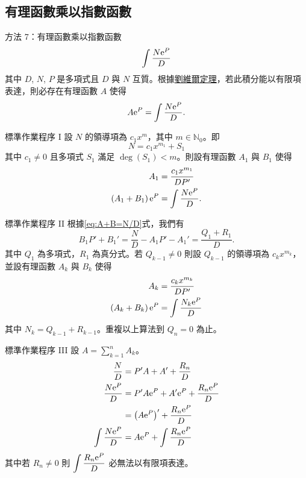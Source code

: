 \documentclass{beamer}
\newcommand{\e}{\textup e}
\newcommand{\N}{\mathbb N}
\theoremstyle{remark}
\begin{document}
\begin{CJK}{UTF8}{bsmi}
\subsection[有理函數乘以指數]{有理函數乘以指數函數}
\begin{frame}{方法 7：有理函數乘以指數函數}
  \[\int \frac{N \e^P}{D}\]
  其中 $D$, $N$, $P$ 是多項式且 $D$ 與 $N$ 互質。根據\href{http://en.wikipedia.org/wiki/Liouville\%27s\textunderscore%
  theorem\textunderscore \%28differential\textunderscore algebra\%29}{劉維爾定理}，若此積分能以有限項表達，則必存在有理函數
  $A$ 使得
  \[A \e^P = \int \frac{N \e^P}{D}.\]
\end{frame}

\begin{frame}{標準作業程序 I}
  設 $N$ 的領導項為 $c_1 x^m$，其中 $m \in \N_0$。即
  \[N = c_1 x^{m_1} + S_1\]
  其中 $c_1 \ne 0$ 且多項式 $S_1$ 滿足 $\deg(S_1) < m$。則設有理函數 $A_1$ 與 $B_1$ 使得
  \begin{align}
    A_1 &= \frac{c_1 x^{m_1}}{DP'} \nonumber \\
    \left( A_1 + B_1 \right) \e^P &= \int \frac{N \e^P}{D}. \label{eq:A+B=N/D}
  \end{align}
\end{frame}

\begin{frame}{標準作業程序 II}
  根據\eqref{eq:A+B=N/D}式，我們有
  \[B_1 P' + B_1' = \frac N D - A_1 P' - A_1' = \frac{Q_1 + R_1}{D}.\]
  其中 $Q_1$ 為多項式，$R_1$ 為真分式。若 $Q_{k-1} \ne 0$ 則設 $Q_{k-1}$ 的領導項為 $c_k x^{m_k}$，並設有理函數
  $A_k$ 與 $B_k$ 使得
  \begin{align*}
    A_k &= \frac{c_k x^{m_k}}{DP'}\\
    \left( A_k + B_k \right) \e^P &= \int \frac{N_k \e^P}{D}
  \end{align*}
  其中 $N_k = Q_{k-1} + R_{k-1}$。重複以上算法到 $Q_n = 0$ 為止。
\end{frame}

\begin{frame}{標準作業程序 III}
  設 $\displaystyle A = \sum_{k=1}^n A_k$。
  \begin{align*}
    \frac N D &= P'A + A' + \frac{R_n}{D}\\
    \frac{N \e^P}{D} &= P'A \e^P + A' \e^P + \frac{R_n \e^P}{D}\\
      &= \left( A \e^P \right)' + \frac{R_n \e^P}{D}\\
    \int \frac{N \e^P}{D} &= A \e^P + \int \frac{R_n \e^P}{D}
  \end{align*}
  其中若 $R_n \ne 0$ 則 $\displaystyle \int \frac{R_n \e^P}{D}$ 必無法以有限項表達。
\end{frame}


\end{CJK}
\end{document}

